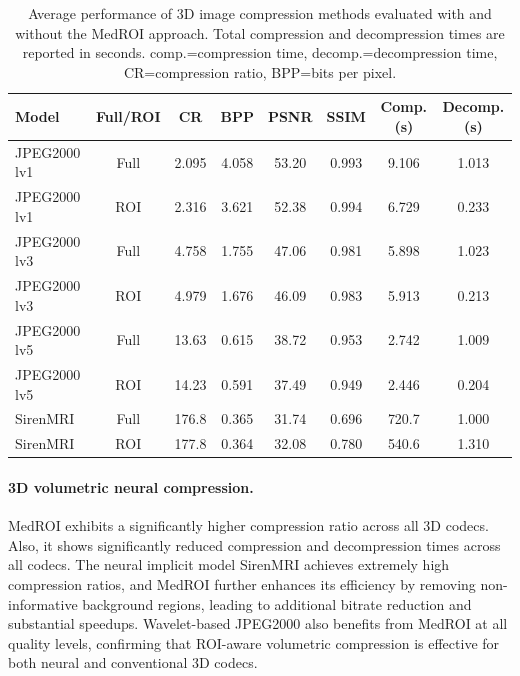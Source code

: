 \documentclass[runningheads]{llncs}
\begin{document}
\label{sec:compression_performance}
\begin{table}[!htb]
\centering
\footnotesize
\begin{tabular}{lccccccc}
\toprule
\textbf{Model} &
\textbf{Full/ROI} &
\textbf{CR} &
\textbf{BPP} &
\textbf{PSNR} &
\textbf{SSIM} &
\textbf{Comp.(s)} &
\textbf{Decomp.(s)} \\
\midrule
JPEG2000 lv1 & Full & 2.095 & 4.058 & 53.20 & 0.993 & 9.106 & 1.013 \\
JPEG2000 lv1 & ROI  & 2.316 & 3.621 & 52.38 & 0.994 & 6.729 & 0.233 \\
\midrule
JPEG2000 lv3 & Full & 4.758 & 1.755 & 47.06 & 0.981 & 5.898 & 1.023 \\
JPEG2000 lv3 & ROI  & 4.979 & 1.676 & 46.09 & 0.983 & 5.913 & 0.213 \\
\midrule
JPEG2000 lv5 & Full & 13.63 & 0.615 & 38.72 & 0.953 & 2.742 & 1.009 \\
JPEG2000 lv5 & ROI  & 14.23 & 0.591 & 37.49 & 0.949 & 2.446 & 0.204 \\
\midrule
SirenMRI & Full & 176.8 & 0.365 & 31.74 & 0.696 & 720.7 & 1.000 \\
SirenMRI & ROI  & 177.8 & 0.364 & 32.08 & 0.780 & 540.6 & 1.310 \\
\bottomrule
\end{tabular}
\caption{Average performance of 3D image compression methods evaluated with and without the MedROI approach. Total compression and decompression times are reported in seconds. comp.=compression time, decomp.=decompression time, CR=compression ratio, BPP=bits per pixel.}
\label{tab:3d_compression_results}
\end{table}

\vspace{-0.2cm}

\paragraph{3D volumetric neural compression.} 
MedROI exhibits a significantly higher compression ratio across all 3D codecs. Also, it shows significantly reduced compression and decompression times across all codecs.
The neural implicit model SirenMRI achieves extremely high compression ratios, and MedROI further enhances its efficiency by removing non-informative background regions, leading to additional bitrate reduction and substantial speedups.
Wavelet-based JPEG2000 also benefits from MedROI at all quality levels, confirming that ROI-aware volumetric compression is effective for both neural and conventional 3D codecs.
\end{document}
